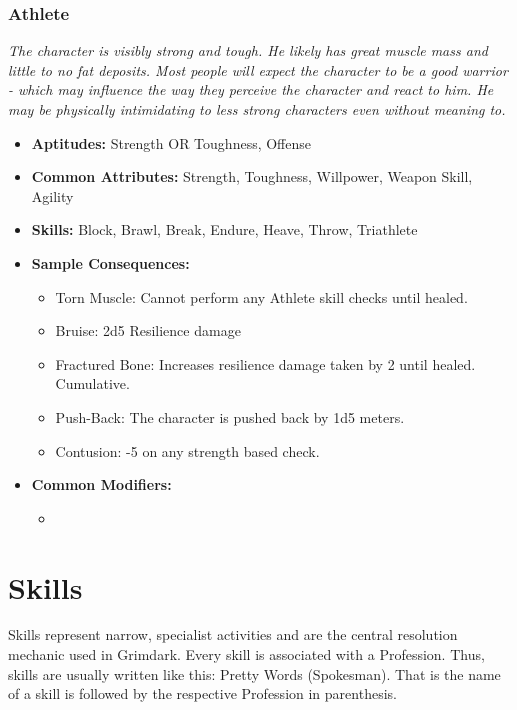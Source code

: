 \subsubsection{Athlete}\label{Athlete}
\textit{The character is visibly strong and tough.
He likely has great muscle mass and little to no fat deposits.
Most people will expect the character to be a good warrior - which may influence the way they perceive the character and react to him.
He may be physically intimidating to less strong characters even without meaning to.}
\begin{itemize}
	\item \textbf{Aptitudes:} Strength OR Toughness, Offense
	\item \textbf{Common Attributes:} Strength, Toughness, Willpower, Weapon Skill, Agility
	\item \textbf{Skills:} Block, Brawl, Break, Endure, Heave, Throw, Triathlete
	\item \textbf{Sample Consequences:} 
	\begin{itemize}
		\item Torn Muscle: Cannot perform any Athlete skill checks until healed.
		\item Bruise: 2d5 Resilience damage
		\item Fractured Bone: Increases resilience damage taken by 2 until healed. Cumulative.
		\item Push-Back: The character is pushed back by 1d5 meters.
		\item Contusion: -5 on any strength based check.
	\end{itemize}
	\item \textbf{Common Modifiers:}
	\begin{itemize}
		\item 
	\end{itemize}
\end{itemize}


\section{Skills}%
\label{sec:skills}
Skills represent narrow, specialist activities and are the central resolution mechanic used in Grimdark. 
Every skill is associated with a Profession.
Thus, skills are usually written like this: Pretty Words (Spokesman).
That is the name of a skill is followed by the respective Profession in parenthesis.

